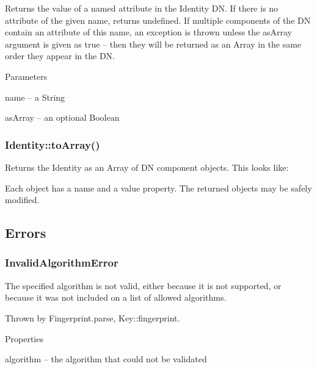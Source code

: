 Returns the value of a named attribute in the Identity DN. If there is no attribute of the given name, returns {\ttfamily undefined}. If multiple components of the DN contain an attribute of this name, an exception is thrown unless the {\ttfamily as\+Array} argument is given as {\ttfamily true} -- then they will be returned as an Array in the same order they appear in the DN.

Parameters


\begin{DoxyItemize}
\item {\ttfamily name} -- a String
\item {\ttfamily as\+Array} -- an optional Boolean
\end{DoxyItemize}

\subsubsection*{{\ttfamily Identity\+::to\+Array()}}

Returns the Identity as an Array of DN component objects. This looks like\+:


\begin{DoxyCode}
\end{DoxyCode}


Each object has a {\ttfamily name} and a {\ttfamily value} property. The returned objects may be safely modified.

\subsection*{Errors }

\subsubsection*{{\ttfamily Invalid\+Algorithm\+Error}}

The specified algorithm is not valid, either because it is not supported, or because it was not included on a list of allowed algorithms.

Thrown by {\ttfamily Fingerprint.\+parse}, {\ttfamily Key\+::fingerprint}.

Properties


\begin{DoxyItemize}
\item {\ttfamily algorithm} -- the algorithm that could not be validated
\end{DoxyItemize}

